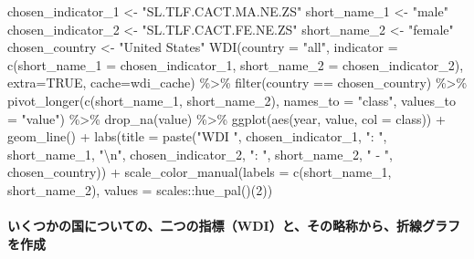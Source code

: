 \documentclass[
]{bxjsbook}
\newenvironment{Shaded}{\begin{snugshade}}{\end{snugshade}}
\newcommand{\AttributeTok}[1]{\textcolor[rgb]{0.77,0.63,0.00}{#1}}
\newcommand{\ConstantTok}[1]{\textcolor[rgb]{0.00,0.00,0.00}{#1}}
\newcommand{\DecValTok}[1]{\textcolor[rgb]{0.00,0.00,0.81}{#1}}
\newcommand{\FunctionTok}[1]{\textcolor[rgb]{0.00,0.00,0.00}{#1}}
\newcommand{\NormalTok}[1]{#1}
\newcommand{\OtherTok}[1]{\textcolor[rgb]{0.56,0.35,0.01}{#1}}
\newcommand{\SpecialCharTok}[1]{\textcolor[rgb]{0.00,0.00,0.00}{#1}}
\newcommand{\StringTok}[1]{\textcolor[rgb]{0.31,0.60,0.02}{#1}}
\theoremstyle{definition}
\theoremstyle{definition}
\theoremstyle{definition}
\theoremstyle{definition}
\theoremstyle{remark}
\begin{document}
\begin{Shaded}
\begin{Highlighting}[]
\NormalTok{chosen\_indicator\_1 }\OtherTok{\textless{}{-}} \StringTok{"SL.TLF.CACT.MA.NE.ZS"}
\NormalTok{short\_name\_1 }\OtherTok{\textless{}{-}} \StringTok{"male"}
\NormalTok{chosen\_indicator\_2 }\OtherTok{\textless{}{-}} \StringTok{"SL.TLF.CACT.FE.NE.ZS"}
\NormalTok{short\_name\_2 }\OtherTok{\textless{}{-}} \StringTok{"female"}
\NormalTok{chosen\_country }\OtherTok{\textless{}{-}} \StringTok{"United States"}
\FunctionTok{WDI}\NormalTok{(}\AttributeTok{country =} \StringTok{"all"}\NormalTok{, }\AttributeTok{indicator =} \FunctionTok{c}\NormalTok{(}\AttributeTok{short\_name\_1 =}\NormalTok{ chosen\_indicator\_1, }\AttributeTok{short\_name\_2 =}\NormalTok{ chosen\_indicator\_2), }\AttributeTok{extra=}\ConstantTok{TRUE}\NormalTok{, }\AttributeTok{cache=}\NormalTok{wdi\_cache) }\SpecialCharTok{\%\textgreater{}\%} 
  \FunctionTok{filter}\NormalTok{(country }\SpecialCharTok{==}\NormalTok{ chosen\_country) }\SpecialCharTok{\%\textgreater{}\%} 
  \FunctionTok{pivot\_longer}\NormalTok{(}\FunctionTok{c}\NormalTok{(short\_name\_1, short\_name\_2), }\AttributeTok{names\_to =} \StringTok{"class"}\NormalTok{, }\AttributeTok{values\_to =} \StringTok{"value"}\NormalTok{) }\SpecialCharTok{\%\textgreater{}\%} \FunctionTok{drop\_na}\NormalTok{(value) }\SpecialCharTok{\%\textgreater{}\%}
  \FunctionTok{ggplot}\NormalTok{(}\FunctionTok{aes}\NormalTok{(year, value, }\AttributeTok{col =}\NormalTok{ class)) }\SpecialCharTok{+} \FunctionTok{geom\_line}\NormalTok{() }\SpecialCharTok{+}
  \FunctionTok{labs}\NormalTok{(}\AttributeTok{title =} \FunctionTok{paste}\NormalTok{(}\StringTok{"WDI "}\NormalTok{, chosen\_indicator\_1, }\StringTok{": "}\NormalTok{, short\_name\_1, }\StringTok{"}\SpecialCharTok{\textbackslash{}n}\StringTok{"}\NormalTok{, chosen\_indicator\_2, }\StringTok{": "}\NormalTok{, short\_name\_2, }\StringTok{" {-} "}\NormalTok{, chosen\_country)) }\SpecialCharTok{+}
  \FunctionTok{scale\_color\_manual}\NormalTok{(}\AttributeTok{labels =} \FunctionTok{c}\NormalTok{(short\_name\_1, short\_name\_2), }\AttributeTok{values =}\NormalTok{ scales}\SpecialCharTok{::}\FunctionTok{hue\_pal}\NormalTok{()(}\DecValTok{2}\NormalTok{))}
\end{Highlighting}
\end{Shaded}

\hypertarget{ux3044ux304fux3064ux304bux306eux56fdux306bux3064ux3044ux3066ux306eux4e8cux3064ux306eux6307ux6a19wdiux3068ux305dux306eux7565ux79f0ux304bux3089ux6298ux7ddaux30b0ux30e9ux30d5ux3092ux4f5cux6210}{%
\paragraph{いくつかの国についての、二つの指標（WDI）と、その略称から、折線グラフを作成}\label{ux3044ux304fux3064ux304bux306eux56fdux306bux3064ux3044ux3066ux306eux4e8cux3064ux306eux6307ux6a19wdiux3068ux305dux306eux7565ux79f0ux304bux3089ux6298ux7ddaux30b0ux30e9ux30d5ux3092ux4f5cux6210}}
\end{document}
